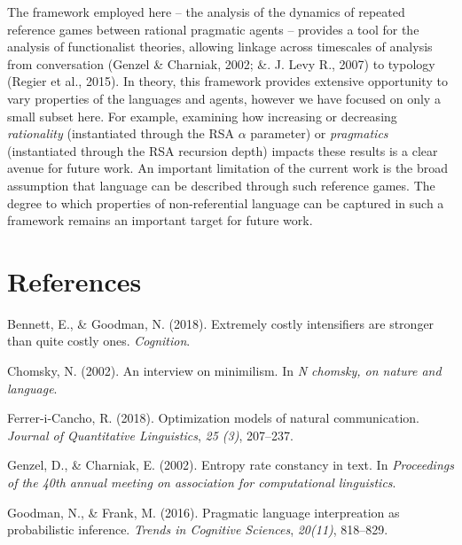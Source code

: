 \documentclass[10pt, letterpaper]{article}
\begin{document}
The framework employed here -- the analysis of the dynamics of repeated
reference games between rational pragmatic agents -- provides a tool for
the analysis of functionalist theories, allowing linkage across
timescales of analysis from conversation (Genzel \& Charniak, 2002; \&.
J. Levy R., 2007) to typology (Regier et al., 2015). In theory, this
framework provides extensive opportunity to vary properties of the
languages and agents, however we have focused on only a small subset
here. For example, examining how increasing or decreasing
\textit{rationality} (instantiated through the RSA \(\alpha\) parameter)
or \textit{pragmatics} (instantiated through the RSA recursion depth)
impacts these results is a clear avenue for future work. An important
limitation of the current work is the broad assumption that language can
be described through such reference games. The degree to which
properties of non-referential language can be captured in such a
framework remains an important target for future work.

\vspace{1em}
\vspace{1em} \noindent

\section{References}\label{references}

\setlength{\parindent}{-0.1in} \setlength{\leftskip}{0.125in} \noindent

\hypertarget{refs}{}
\hypertarget{ref-BennettGoodman2015a}{}
Bennett, E., \& Goodman, N. (2018). Extremely costly intensifiers are
stronger than quite costly ones. \emph{Cognition}.

\hypertarget{ref-Chomsky2002a}{}
Chomsky, N. (2002). An interview on minimilism. In \emph{N chomsky, on
nature and language}.

\hypertarget{ref-FerreriCancho2018a}{}
Ferrer-i-Cancho, R. (2018). Optimization models of natural
communication. \emph{Journal of Quantitative Linguistics}, \emph{25
(3)}, 207--237.

\hypertarget{ref-GenzelCharniak2002a}{}
Genzel, D., \& Charniak, E. (2002). Entropy rate constancy in text. In
\emph{Proceedings of the 40th annual meeting on association for
computational linguistics}.

\hypertarget{ref-GoodmanFrank2016a}{}
Goodman, N., \& Frank, M. (2016). Pragmatic language interpreation as
probabilistic inference. \emph{Trends in Cognitive Sciences},
\emph{20(11)}, 818--829.
\end{document}
